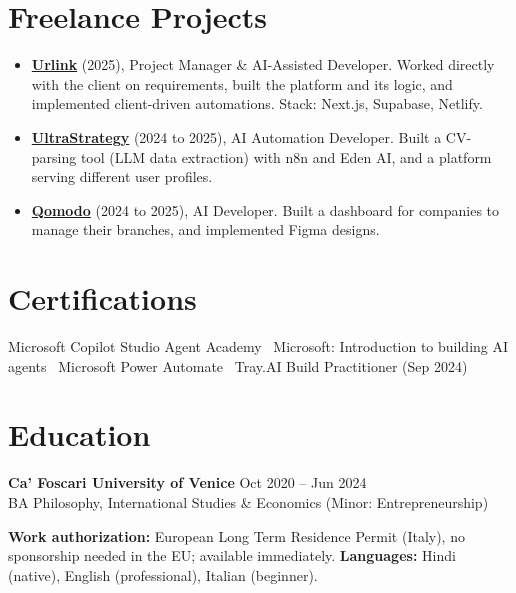 \documentclass[a4paper,10pt]{article}
\begin{document}
\section{Freelance Projects}
\begin{itemize}
 \item \textbf{\href{https://smarturlink.com/}{Urlink}} (2025), Project Manager \& AI-Assisted Developer. Worked directly with the client on requirements, built the platform and its logic, and implemented client-driven automations. Stack: Next.js, Supabase, Netlify.
 \item \textbf{\href{https://ultrastrategy.com}{UltraStrategy}} (2024 to 2025), AI Automation Developer. Built a CV-parsing tool (LLM data extraction) with n8n and Eden AI, and a platform serving different user profiles.
 \item \textbf{\href{https://www.qomodo.me/}{Qomodo}} (2024 to 2025), AI Developer. Built a dashboard for companies to manage their branches, and implemented Figma designs.
\end{itemize}

\section{Certifications}
Microsoft Copilot Studio Agent Academy \textbullet\ Microsoft: Introduction to building AI agents \textbullet\ Microsoft Power Automate \textbullet\ Tray.AI Build Practitioner (Sep 2024)

\section{Education}
\textbf{Ca' Foscari University of Venice} \hfill Oct 2020 -- Jun 2024\\
BA Philosophy, International Studies \& Economics (Minor: Entrepreneurship)

\vspace{2pt}
{\small \textbf{Work authorization:} European Long Term Residence Permit (Italy), no sponsorship needed in the EU; available immediately. \quad \textbf{Languages:} Hindi (native), English (professional), Italian (beginner).}
\end{document}
